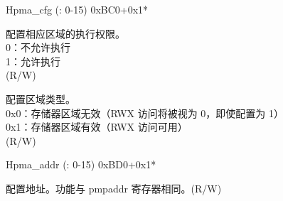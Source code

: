 \addtocounter{Regfloat}{-1}
\begin{register}{H}{pma\_cfg (: 0-15)} {0xBC0+0x1*}
\begin{regdesc}\begin{reglist}
\item [接上页……]
\label{fielddesc:EXECUTE}\item [EXECUTE] 配置相应区域的执行权限。\\
0：不允许执行\\
1：允许执行\\
(R/W)
\label{fielddesc:TYPE}\item [TYPE] 配置区域类型。\\
0x0：存储器区域无效（RWX 访问将被视为 0，即使配置为 1）\\
0x1：存储器区域有效（RWX 访问可用）\\
(R/W)
\end{reglist}
\end{regdesc}
\end{register}

\begin{register}{H}{pma\_addr (: 0-15)} {0xBD0+0x1*}
\label{regdesc:pma_addrX}
%
\regnewline%
\begin{regdesc}
\begin{reglist}
\label{fielddesc:PMAADDR}\item [ADDR] 配置地址。功能与 pmpaddr 寄存器相同。(R/W)
\end{reglist}
\end{regdesc}
\end{register}
